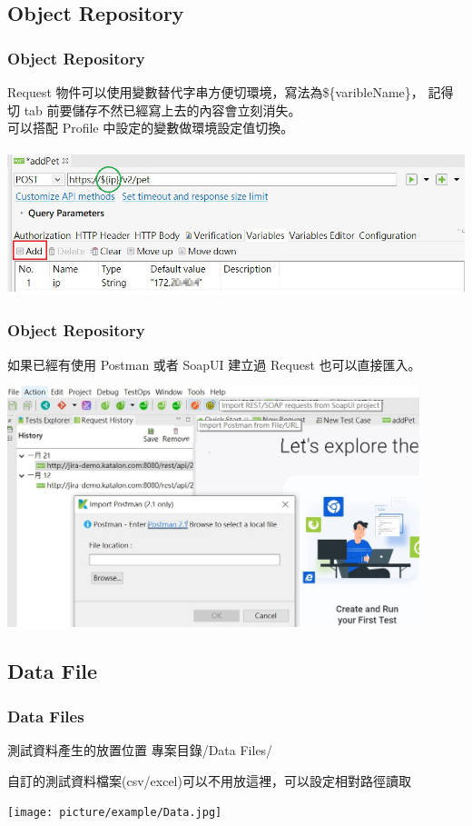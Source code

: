 \documentclass{beamer}
\begin{document}
\subsection{Object Repository}
\begin{frame}
    \frametitle{Object Repository}
    Request 物件可以使用變數替代字串方便切環境，寫法為\$\{varibleName\}，
    記得切 tab 前要儲存不然已經寫上去的內容會立刻消失。
    ~\\
    可以搭配 Profile 中設定的變數做環境設定值切換。
    ~\\~\\
    \includegraphics[width=1\textwidth]{picture/addVarible.jpg}
\end{frame}
\begin{frame}
    \frametitle{Object Repository}
    如果已經有使用 Postman 或者 SoapUI 建立過 Request 也可以直接匯入。
    \begin{center}
        \includegraphics[width=0.9\textwidth]{picture/importRequest.jpg}
    \end{center}
\end{frame}
\label{dataFile}
\subsection{Data File}
\begin{frame}
	\frametitle{Data Files}
	\begin{block}{測試資料產生的放置位置}
		專案目錄/Data Files/
	\end{block}
	自訂的測試資料檔案(csv/excel)可以不用放這裡，可以設定相對路徑讀取
    \begin{center}
        \texttt{[image: picture/example/Data.jpg]}
    \end{center}
\end{frame}
\label{keywords}
\end{document}
